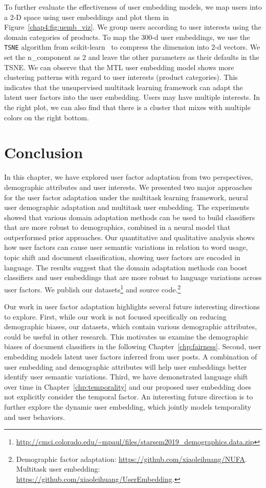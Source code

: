 To further evaluate the effectiveness of user embedding models, we map users into a 2-D space using user embeddings and plot them in Figure~\ref{chap4:fig:uemb_viz}.
We group users according to user interests using the domain categories of products.
To map the 300-d user embeddings, we use the \texttt{TSNE} algorithm from scikit-learn~\cite{pedregosa2011scikit} to compress the dimension into 2-d vectors. We set the n\_component as 2 and leave the other parameters as their defaults in the TSNE.
We can observe that the MTL user embedding model shows more clustering patterns with regard to user interests (product categories).
This indicates that the unsupervised multitask learning framework can adapt the latent user factors into the user embedding.
Users may have multiple interests. In the right plot, we can also find that there is a cluster that mixes with multiple colors on the right bottom.


\section{Conclusion}

In this chapter, we have explored user factor adaptation from two perspectives, demographic attributes and user interests.
We presented two major approaches for the user factor adaptation under the multitask learning framework, neural user demographic adaptation and multitask user embedding.
The experiments showed that various domain adaptation methods can be used to build classifiers that are more robust to demographics, combined in a neural model that outperformed prior approaches.
Our quantitative and qualitative analysis shows how user factors can cause user semantic variations in relation to word usage, topic shift and document classification, showing user factors are encoded in language.
The results suggest that the domain adaptation methods can boost classifiers and user embeddings that are more robust to language variations across user factors.
We publish our datasets\footnote{\url{http://cmci.colorado.edu/~mpaul/files/starsem2019_demographics.data.zip}} and source code.\footnote{Demographic factor adaptation: \url{https://github.com/xiaoleihuang/NUFA}. Multitask user embedding: \url{https://github.com/xiaoleihuang/UserEmbedding}.}

Our work in user factor adaptation highlights several future interesting directions to explore.
First, while our work is not focused specifically on reducing demographic biases,
our datasets, which contain various demographic attributes, could be useful in other research. 
This motivates us examine the demographic biases of document classifiers in the following Chapter~\ref{chp:fairness}. 
Second, user embedding models latent user factors inferred from user posts. A combination of user embedding and demographic attributes will help user embeddings better identify user semantic variations. 
Third, we have demonstrated language shift over time in Chapter~\ref{chp:temporality} and our proposed user embedding does not explicitly consider the temporal factor. An interesting future direction is to further explore the dynamic user embedding, which jointly models temporality and user behaviors.
